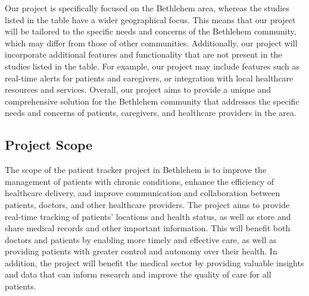 \documentclass[12pt]{article}
\begin{document}
		 	\newpage
		 	Our project is specifically focused on the Bethlehem area, whereas the studies listed in the table have a wider geographical focus. This means that our project will be tailored to the specific needs and concerns of the Bethlehem community, which may differ from those of other communities. Additionally, our project will incorporate additional features and functionality that are not present in the studies listed in the table. For example, our project may include features such as real-time alerts for patients and caregivers, or integration with local healthcare resources and services. Overall, our project aims to provide a unique and comprehensive solution for the Bethlehem community that addresses the specific needs and concerns of patients, caregivers, and healthcare providers in the area.\\
		\subsection{Project Scope}
			\quad The scope of the patient tracker project in Bethlehem is to improve the management of patients with chronic conditions, enhance the efficiency of healthcare delivery, and improve communication and collaboration between patients, doctors, and other healthcare providers. The project aims to provide real-time tracking of patients’ locations and health status, as well as store and share medical records and other important information. This will benefit both doctors and patients by enabling more timely and effective care, as well as providing patients with greater control and autonomy over their health. In addition, the project will benefit the medical sector by providing valuable insights and data that can inform research and improve the quality of care for all patients.\\
			
\end{document}
